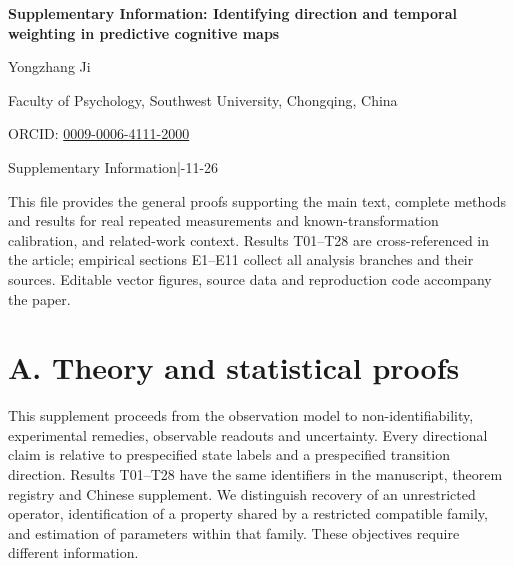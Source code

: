 \documentclass[11pt,a4paper]{article}
\begin{document}
\thispagestyle{plain}
{\raggedright{}\sffamily\bfseries\color{Ink}\fontsize{20}{25}\selectfont Supplementary
Information: Identifying direction and temporal weighting in predictive
cognitive maps\par}
\vspace{8pt}
{\sffamily\fontsize{12}{15}\selectfont Yongzhang Ji\par}
\vspace{4pt}
{\sffamily\small Faculty of Psychology, Southwest University, Chongqing,
China\par}
\vspace{3pt}
{\sffamily\footnotesize\color{Muted} ORCID: \href{https://orcid.org/0009-0006-4111-2000}{0009-0006-4111-2000}\par}
\vspace{7pt}
{\sffamily\footnotesize\color{Muted} Supplementary Information\quad |-11-26\par}
\vspace{8pt}
This file provides the general proofs supporting the main text, complete
methods and results for real repeated measurements and
known-transformation calibration, and related-work context. Results
T01–T28 are cross-referenced in the article; empirical sections E1–E11
collect all analysis branches and their sources. Editable vector
figures, source data and reproduction code accompany the paper.

\begingroup
\fontsize{8.8}{10.3}\selectfont
\linespread{1.0}\selectfont
\setlength{\parskip}{0pt}
\tableofcontents
\endgroup

\clearpage

\section{A. Theory and statistical
proofs}\label{a.-theory-and-statistical-proofs}

This supplement proceeds from the observation model to
non-identifiability, experimental remedies, observable readouts and
uncertainty. Every directional claim is relative to prespecified state
labels and a prespecified transition direction. Results T01–T28 have
the same identifiers in the manuscript, theorem registry and Chinese
supplement. We distinguish recovery of an unrestricted operator,
identification of a property shared by a restricted compatible family,
and estimation of parameters within that family. These objectives
require different information.

\end{document}
